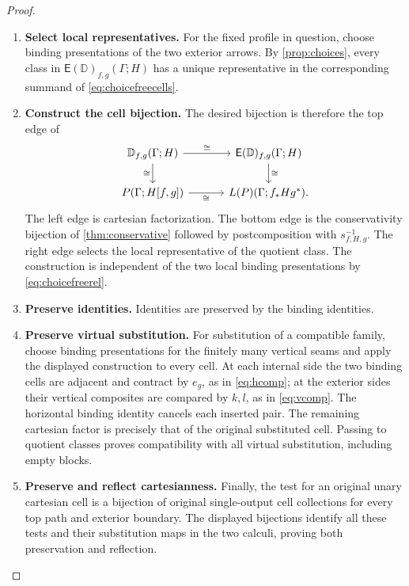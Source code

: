 \documentclass[11pt,reqno]{amsart}
\theoremstyle{plain}
\theoremstyle{definition}
\theoremstyle{remark}
\numberwithin{equation}{section}
\newcommand{\D}{\mathbb D}
\newcommand{\E}{\mathsf E}
\begin{document}
\begin{proof}\leavevmode
\begin{enumerate}
\item \textbf{Select local representatives.} For the fixed profile in question, choose binding presentations of the two
exterior arrows. By \cref{prop:choices}, every class in
$\E(\D)_{f,g}(\Gamma;H)$ has a unique representative in the corresponding
summand of \cref{eq:choicefreecells}.

\item \textbf{Construct the cell bijection.} The desired bijection is therefore
the top edge of
\[
\begin{tikzcd}[column sep=3.2em]
\D_{f,g}(\Gamma;H) \arrow[r,"\cong"] \arrow[d,"\cong"'] &
\E(\D)_{f,g}(\Gamma;H) \arrow[d,"\cong"]\\
P(\Gamma;H[f,g]) \arrow[r,"\cong"'] & L(P)(\Gamma;f_*Hg^*).
\end{tikzcd}
\]
The left edge is cartesian factorization. The bottom edge is the
conservativity bijection of \cref{thm:conservative} followed by
postcomposition with $s_{f,H,g}^{-1}$. The right edge selects the local
representative of the quotient class. The construction
is independent of the two local binding presentations by
\cref{eq:choicefreerel}.

\item \textbf{Preserve identities.} Identities are preserved by the binding identities.

\item \textbf{Preserve virtual substitution.} For substitution of a
compatible family, choose binding presentations for the finitely many
vertical seams and apply the displayed construction to every cell. At each
internal side the two binding cells are adjacent and contract by $e_g$, as
in \cref{eq:hcomp}; at the exterior sides their vertical composites are
compared by $k,l$, as in \cref{eq:vcomp}. The horizontal binding identity
cancels each inserted pair. The remaining cartesian factor is precisely
that of the original substituted cell. Passing to quotient classes proves
compatibility with all virtual substitution, including empty blocks.

\item \textbf{Preserve and reflect cartesianness.} Finally, the test for an original unary cartesian cell is a bijection of
original single-output cell collections for every top path and exterior
boundary. The displayed bijections identify all these tests and their
substitution maps in the two calculi, proving both preservation and
reflection.\qedhere
\end{enumerate}
\end{proof}
\end{document}
